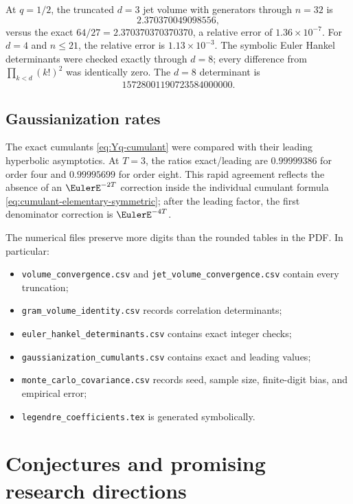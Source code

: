 \documentclass[11pt,a4paper]{article}
\theoremstyle{definition}
\theoremstyle{remark}
\begin{document}
At $q=1/2$, the truncated $d=3$ jet volume with generators through $n=32$ is
\[
  2.370370049098556,
\]
versus the exact $64/27=2.370370370370370$, a relative error of $1.36\times10^{-7}$.  For $d=4$ and $n\le21$, the relative error is $1.13\times10^{-3}$.  The symbolic Euler Hankel determinants were checked exactly through $d=8$; every difference from $\prod_{k<d}(k!)^2$ was identically zero.  The $d=8$ determinant is
\[
  15728001190723584000000.
\]

\subsection{Gaussianization rates}

The exact cumulants \eqref{eq:Yq-cumulant} were compared with their leading hyperbolic asymptotics.  At $T=3$, the ratios exact/leading are $0.99999386$ for order four and $0.99995699$ for order eight.  This rapid agreement reflects the absence of an $\EulerE^{-2T}$ correction inside the individual cumulant formula \eqref{eq:cumulant-elementary-symmetric}; after the leading factor, the first denominator correction is $\EulerE^{-4T}$.

\begin{compbox}
The numerical files preserve more digits than the rounded tables in the PDF.  In particular:
\begin{itemize}[leftmargin=1.8em]
\item \texttt{volume\_convergence.csv} and \texttt{jet\_volume\_convergence.csv} contain every truncation;
\item \texttt{gram\_volume\_identity.csv} records correlation determinants;
\item \texttt{euler\_hankel\_determinants.csv} contains exact integer checks;
\item \texttt{gaussianization\_cumulants.csv} contains exact and leading values;
\item \texttt{monte\_carlo\_covariance.csv} records seed, sample size, finite-digit bias, and empirical error;
\item \texttt{legendre\_coefficients.tex} is generated symbolically.
\end{itemize}
\end{compbox}

\section{Conjectures and promising research directions}
\label{sec:conjectures}
\end{document}
